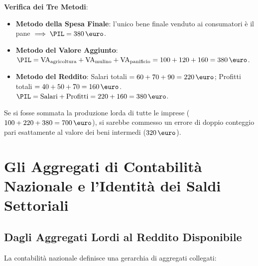 \begin{esempio}
\textbf{Verifica dei Tre Metodi}:
\begin{itemize}
    \item \textbf{Metodo della Spesa Finale}: l'unico bene finale venduto ai consumatori è il pane $\implies \PIL = 380\,\text{\euro}$.
    \item \textbf{Metodo del Valore Aggiunto}: $\PIL = \mathrm{VA}_{\text{agricoltura}} + \mathrm{VA}_{\text{mulino}} + \mathrm{VA}_{\text{panificio}} = 100 + 120 + 160 = 380\,\text{\euro}$.
    \item \textbf{Metodo del Reddito}: Salari totali $= 60 + 70 + 90 = 220\,\text{\euro}$; Profitti totali $= 40 + 50 + 70 = 160\,\text{\euro}$. $\PIL = \text{Salari} + \text{Profitti} = 220 + 160 = 380\,\text{\euro}$.
\end{itemize}
Se si fosse sommata la produzione lorda di tutte le imprese ($100 + 220 + 380 = 700\,\text{\euro}$), si sarebbe commesso un errore di doppio conteggio pari esattamente al valore dei beni intermedi ($320\,\text{\euro}$).
\end{esempio}

\section{Gli Aggregati di Contabilità Nazionale e l'Identità dei Saldi Settoriali}

\subsection{Dagli Aggregati Lordi al Reddito Disponibile}
La contabilità nazionale definisce una gerarchia di aggregati collegati:

